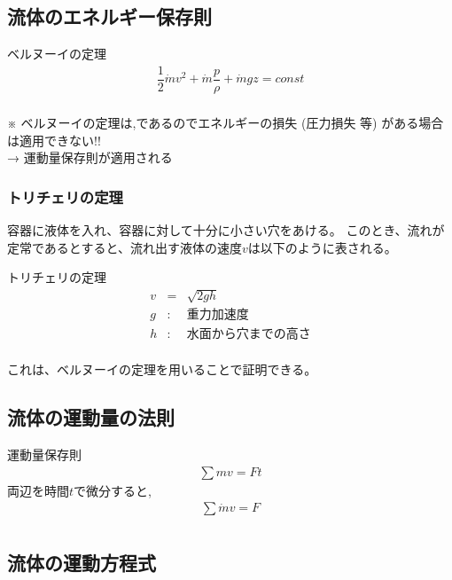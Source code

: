 \documentclass[a4paper]{jsarticle}
\begin{document}
\subsection{流体のエネルギー保存則}
\begin{itembox}[l]{ベルヌーイの定理}
    \begin{eqnarray*}
        \dfrac{1}{2}\dot{m}v^2+\dot{m}\dfrac{p}{\rho}+\dot{m}gz=const\\
    \end{eqnarray*}
\end{itembox}
※ ベルヌーイの定理は,であるのでエネルギーの損失 (圧力損失 等) がある場合は適用できない!!\\
→ 運動量保存則が適用される
\subsubsection{トリチェリの定理}
容器に液体を入れ、容器に対して十分に小さい穴をあける。
このとき、流れが定常であるとすると、流れ出す液体の速度$v$は以下のように表される。
\begin{itembox}[l]{トリチェリの定理}
    \begin{eqnarray*}
        v&=&\sqrt{2gh}\\
        g&:&重力加速度\\
        h&:&水面から穴までの高さ\\
    \end{eqnarray*}
\end{itembox}
これは、ベルヌーイの定理を用いることで証明できる。
\subsection{流体の運動量の法則}
\begin{itembox}[l]{運動量保存則}
    \begin{eqnarray*}
        \displaystyle\sum mv=Ft
    \end{eqnarray*}
    両辺を時間$t$で微分すると,
    \begin{eqnarray*}
        \displaystyle\sum \dot{m}v=F\\
    \end{eqnarray*}
\end{itembox}
\subsection{流体の運動方程式}
\end{document}
